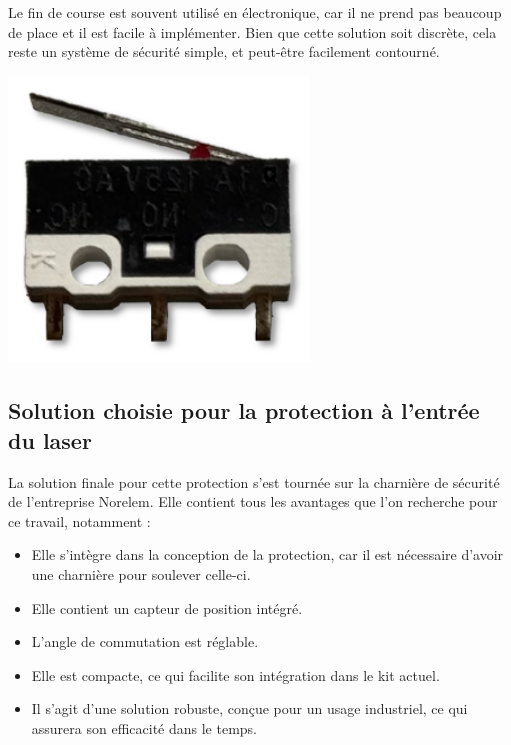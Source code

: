 \begin{minipage}[c]{0.6\textwidth}
    Le fin de course est souvent utilisé en électronique, car il ne prend pas beaucoup de place et il est facile à implémenter. Bien que cette solution soit discrète, cela reste un système de sécurité simple, et peut-être facilement contourné.

\end{minipage}\hfill
\begin{minipage}[c]{0.35\textwidth}
    \begin{center}
        \includegraphics[width=0.6\textwidth]{assets/figures/Protections_laser/Securite_electrique/fin_de_course.png}
    \end{center}
    \label{fin_de_course}
\end{minipage}

\newpage
\subsection{Solution choisie pour la protection à l'entrée du laser}
La solution finale pour cette protection s'est tournée sur la charnière de sécurité de l'entreprise Norelem. Elle contient tous les avantages que l'on recherche pour ce travail, notamment :
\begin{itemize}[label=\textbullet]
    \item Elle s'intègre dans la conception de la protection, car il est nécessaire d'avoir une charnière pour soulever celle-ci.
    \item Elle contient un capteur de position intégré.
    \item L'angle de commutation est réglable.
    \item Elle est compacte, ce qui facilite son intégration dans le kit actuel.
    \item Il s'agit d'une solution robuste, conçue pour un usage industriel, ce qui assurera son efficacité dans le temps.
\end{itemize}

